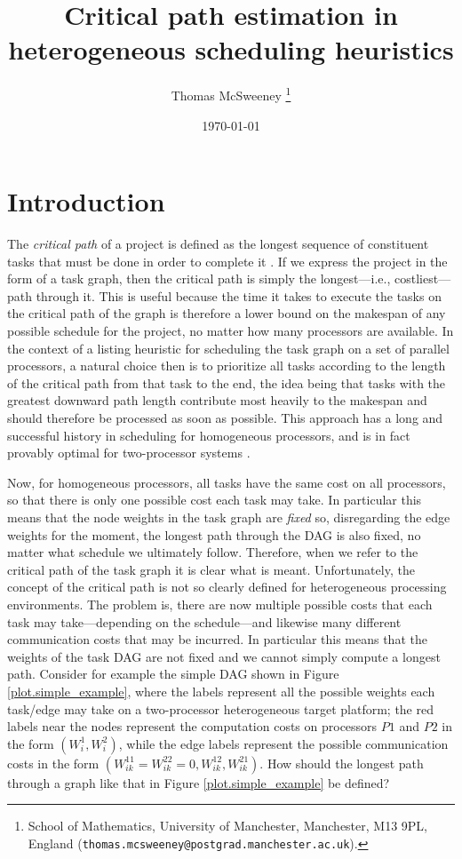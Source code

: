\documentclass[12pt]{article}
\title{Critical path estimation in heterogeneous scheduling heuristics} %
\author{Thomas McSweeney%
	\thanks{%
		School of Mathematics,
		University of Manchester,
		Manchester, M13 9PL, England
		(\texttt{thomas.mcsweeney@postgrad.manchester.ac.uk}).
	}
}
\date{\today}
\begin{document}
	\maketitle 	


\section{Introduction}
\label{sect.intro}

The {\em critical path} of a project is defined as the longest sequence of constituent tasks that must be done in order to complete it \cite{kel59,kel61}. If we express the project in the form of a task graph, then the critical path is simply the longest---i.e., costliest---path through it. This is useful because the time it takes to execute the tasks on the critical path of the graph is therefore a lower bound on the makespan of any possible schedule for the project, no matter how many processors are available. In the context of a listing heuristic for scheduling the task graph on a set of parallel processors, a natural choice then is to prioritize all tasks according to the length of the critical path from that task to the end, the idea being that tasks with the greatest downward path length contribute most heavily to the makespan and should therefore be processed as soon as possible. This approach has a long and successful history in scheduling for homogeneous processors, and is in fact provably optimal for two-processor systems \cite{cof72}. 

Now, for homogeneous processors, all tasks have the same cost on all processors, so that there is only one possible cost each task may take. In particular this means that the node weights in the task graph are {\em fixed} so, disregarding the edge weights for the moment, the longest path through the DAG is also fixed, no matter what schedule we ultimately follow. Therefore, when we refer to the critical path of the task graph it is clear what is meant. Unfortunately, the concept of the critical path is not so clearly defined for heterogeneous processing environments. The problem is, there are now multiple possible costs that each task may take---depending on the schedule---and likewise many different communication costs that may be incurred. In particular this means that the weights of the task DAG are not fixed and we cannot  simply compute a longest path. Consider for example the simple DAG shown in Figure \ref{plot.simple_example}, where the labels represent all the possible weights each task/edge may take on a two-processor heterogeneous target platform; the red labels near the nodes represent the computation costs on processors $P1$ and $P2$ in the form $(W_i^1, W_i^2)$, while the edge labels represent the possible communication costs in the form $(W_{ik}^{11} = W_{ik}^{22} = 0, W_{ik}^{12}, W_{ik}^{21})$. How should the longest path through a graph like that in Figure \ref{plot.simple_example} be defined?
\end{document}
